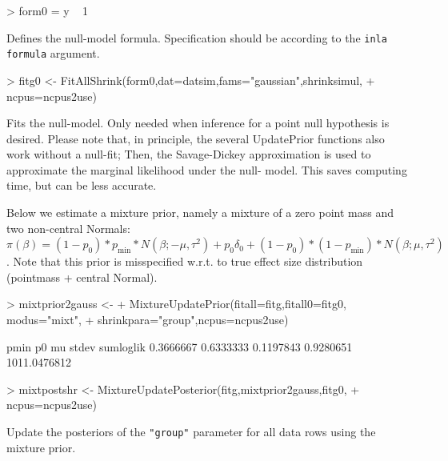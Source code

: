 \documentclass[11pt]{article}
\begin{document}
\begin{Schunk}
\begin{Sinput}
> form0 = y ~  1
\end{Sinput}
\end{Schunk}
Defines the null-model formula. Specification should be according to the {\tt inla formula} argument.


\begin{Schunk}
\begin{Sinput}
> fitg0 <- FitAllShrink(form0,dat=datsim,fams="gaussian",shrinksimul,
+ ncpus=ncpus2use)
\end{Sinput}
\end{Schunk}
Fits the null-model. Only needed when inference for a point
null hypothesis is desired. Please note that, in principle, the
several UpdatePrior functions also work without a null-fit;
Then, the Savage-Dickey approximation is used to approximate
the marginal likelihood under the null- model. This saves
computing time, but can be less accurate.

Below we estimate a mixture
prior, namely a mixture of a zero point mass and two
non-central Normals: $\pi(\beta) =  (1-p_0)*p_{\text{min}} * N(\beta;
-\mu,\tau^2) + p_0 \delta_0 + (1-p_0)*(1-p_{\text{min}} ) * N(\beta; \mu,\tau^2)$. Note that this prior
is misspecified w.r.t. to true effect size distribution (pointmass + central Normal).

\begin{Schunk}
\begin{Sinput}
> mixtprior2gauss <-
+ MixtureUpdatePrior(fitall=fitg,fitall0=fitg0, modus="mixt",
+ shrinkpara="group",ncpus=ncpus2use)
\end{Sinput}
\end{Schunk}

\begin{Schunk}
\begin{Soutput}
        pmin           p0           mu        stdev    sumloglik
   0.3666667    0.6333333    0.1197843    0.9280651 1011.0476812
\end{Soutput}
\end{Schunk}

\begin{Schunk}
\begin{Sinput}
> mixtpostshr <- MixtureUpdatePosterior(fitg,mixtprior2gauss,fitg0,
+ ncpus=ncpus2use)
\end{Sinput}
\end{Schunk}
Update the posteriors of the {\tt "group"} parameter for all data rows using the mixture prior.
\end{document}
